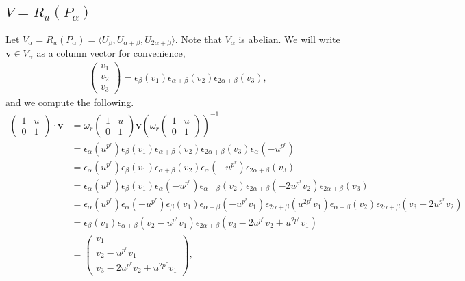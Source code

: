 \subsection{$V = R_u(P_\alpha)$}
\label{b2:alpha}

Let $V_\alpha=R_u(P_\alpha)=\langle U_\beta, U_{\alpha + \beta}, U_{2\alpha + \beta} \rangle$. Note that $V_\alpha$ is abelian.
We will write $\mathbf{v}\in V_\alpha$ as a column vector for convenience,
\begin{align*}
	\left(\begin{matrix}v_1\\v_2\\v_3\end{matrix}\right) = \epsilon_\beta(v_1)\epsilon_{\alpha+\beta}(v_2)\epsilon_{2\alpha+\beta}(v_3),
\end{align*}
and we compute the following.
\begin{align*}
\left(\begin{matrix} 1 & u \\ 0 & 1\end{matrix}\right) \cdot \mathbf{v} 
&= 
\omega_r\left(\begin{matrix} 1 & u \\ 0 & 1\end{matrix}\right) \mathbf{v}\left( \omega_r\left(\begin{matrix} 1 & u \\ 0 & 1\end{matrix}\right)\right)^{-1} \\
&=
\epsilon_ \alpha (u^{p^r}) \epsilon_ \beta (v_1)\epsilon_{\alpha+\beta}(v_2) \epsilon_{2\alpha+\beta}(v_3) \epsilon_ \alpha (-u^{p^r}) \\
&=
\epsilon_ \alpha (u^{p^r}) \epsilon_ \beta (v_1) \epsilon_{\alpha+\beta}(v_2) \epsilon_ \alpha (-u^{p^r}) \epsilon_{2\alpha+\beta}(v_3) \\
&=
\epsilon_ \alpha (u^{p^r}) \epsilon_ \beta (v_1)  \epsilon_ \alpha (-u^{p^r}) \epsilon_{\alpha+\beta}(v_2) \epsilon_{2\alpha+\beta}(-2u^{p^r}v_2)\epsilon_{2\alpha+\beta}(v_3)\\
&=
\epsilon_ \alpha (u^{p^r}) \epsilon_ \alpha (-u^{p^r})  \epsilon_ \beta (v_1) \epsilon_{\alpha+\beta}(-u^{p^r}v_1) \epsilon_{2\alpha+\beta}(u^{2p^r}v_1) \epsilon_{\alpha+\beta}(v_2) \epsilon_{2\alpha+\beta}(v_3-2u^{p^r}v_2)\\
&=
\epsilon_ \beta (v_1)  \epsilon_{\alpha+\beta}(v_2-u^{p^r}v_1) \epsilon_{2\alpha+\beta}(v_3-2u^{p^r}v_2 + u^{2p^r}v_1)\\
&= \left(\begin{matrix} v_1 \\ v_2-u^{p^r}v_1 \\ v_3-2u^{p^r}v_2 + u^{2p^r}v_1 \end{matrix}\right),
\end{align*}
